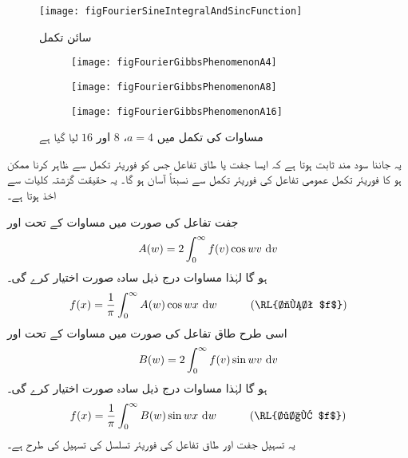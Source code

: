 \begin{figure}
\centering
\texttt{[image: figFourierSineIntegralAndSincFunction]}
\caption{سائن تکمل}
\label{شکل_فوریئر_سائن_تکمل}
\end{figure}
%
\begin{figure}
\centering
\begin{subfigure}{0.5\textwidth}
\centering
\texttt{[image: figFourierGibbsPhenomenonA4]}
\end{subfigure}
\begin{subfigure}{0.5\textwidth}
\centering
\texttt{[image: figFourierGibbsPhenomenonA8]}
\end{subfigure}
\begin{subfigure}{0.5\textwidth}
\centering
\texttt{[image: figFourierGibbsPhenomenonA16]}
\end{subfigure}
\caption{مساوات  کی تکمل میں $a=4$، $8$ اور $16$ لیا گیا ہے}
\label{شکل_فوریئر_مظہر_گبس}
\end{figure}

یہ جاننا سود مند ثابت ہوتا ہے کہ ایسا جفت یا طاق تفاعل جس کو فوریئر تکمل سے ظاہر کرنا ممکن ہو کا فوریئر تکمل عمومی تفاعل کی فوریئر تکمل سے نسبتاً آسان ہو گا۔ یہ حقیقت گزشتہ کلیات سے اخذ ہوتا ہے۔

جفت تفاعل  کی صورت میں مساوات   کے تحت  اور
\begin{align}\label{مساوات_فوریئر_تکمل_جفت_الف}
A(w)=2\int_0^{\infty} f(v)\cos wv\, \dif v
\end{align}
ہو گا لہٰذا مساوات  درج ذیل سادہ صورت اختیار کرے گی۔
\begin{align}\label{مساوات_فوریئر_تکمل_جفت_ب}
f(x)=\frac{1}{\pi}\int_0^{\infty} A(w)\cos wx\,\dif w\quad \quad \quad (\text{\RL{جفت $f$}})
\end{align}
اسی طرح طاق تفاعل  کی صورت میں مساوات   کے تحت  اور
\begin{align}\label{مساوات_فوریئر_تکمل_جفت_پ}
B(w)=2\int_0^{\infty} f(v)\sin wv\, \dif v
\end{align}
ہو گا لہٰذا مساوات  درج ذیل سادہ صورت اختیار کرے گی۔
\begin{align}\label{مساوات_فوریئر_تکمل_جفت_ت}
f(x)=\frac{1}{\pi}\int_0^{\infty} B(w)\sin wx\,\dif w\quad \quad \quad (\text{\RL{طاق $f$}})
\end{align}
یہ تسہیل جفت اور طاق تفاعل کی  فوریئر تسلسل کی تسہیل کی طرح ہے۔


